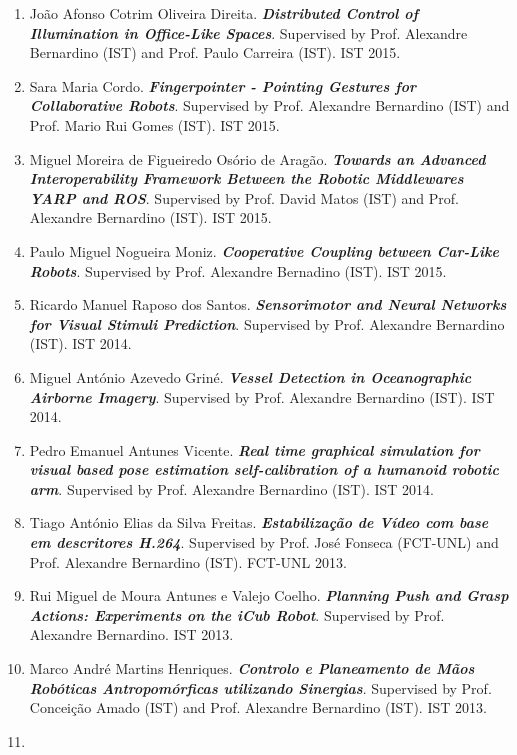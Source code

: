 \begin{enumerate}
{{  Detection with Multichannel Convolutional Neural Networks}}.
  Supervised by Prof. Jacinto Nascimento (IST) and Prof. Alexandre
  Bernardino (IST). IST 2015.
\item
  João Afonso Cotrim Oliveira Direita. \emph{\textbf{Distributed Control
  of Illumination in Office-Like Spaces}}. Supervised by Prof. Alexandre
  Bernardino (IST) and Prof. Paulo Carreira (IST). IST 2015.
\item
  Sara Maria Cordo. \emph{\textbf{Fingerpointer - Pointing Gestures for
  Collaborative Robots}}. Supervised by Prof. Alexandre Bernardino (IST)
  and Prof. Mario Rui Gomes (IST). IST 2015.
\item
  Miguel Moreira de Figueiredo Osório de Aragão. \emph{\textbf{Towards
  an Advanced Interoperability Framework Between the Robotic Middlewares
  YARP and ROS}}. Supervised by Prof. David Matos (IST) and Prof.
  Alexandre Bernardino (IST). IST 2015.
\item
  Paulo Miguel Nogueira Moniz. \emph{\textbf{Cooperative Coupling
  between Car-Like Robots}}. Supervised by Prof. Alexandre Bernadino
  (IST). IST 2015.
\item
  Ricardo Manuel Raposo dos Santos. \emph{\textbf{Sensorimotor and
  Neural Networks for Visual Stimuli Prediction}}. Supervised by Prof.
  Alexandre Bernardino (IST). IST 2014.
\item
  Miguel António Azevedo Griné. \emph{\textbf{Vessel Detection in
  Oceanographic Airborne Imagery}}. Supervised by Prof. Alexandre
  Bernardino (IST). IST 2014.
\item
  Pedro Emanuel Antunes Vicente. \emph{\textbf{Real time graphical
  simulation for visual based pose estimation self-calibration of a
  humanoid robotic arm}}. Supervised by Prof. Alexandre Bernardino
  (IST). IST 2014.
\item
  Tiago António Elias da Silva Freitas. \emph{\textbf{Estabilização de
  Vídeo com base em descritores H.264}}. Supervised by Prof. José
  Fonseca (FCT-UNL) and Prof. Alexandre Bernardino (IST). FCT-UNL 2013.
\item
  Rui Miguel de Moura Antunes e Valejo Coelho. \emph{\textbf{Planning
  Push and Grasp Actions: Experiments on the iCub Robot}}. Supervised by
  Prof. Alexandre Bernardino. IST 2013.
\item
  Marco André Martins Henriques. \emph{\textbf{Controlo e Planeamento de
  Mãos Robóticas Antropomórficas utilizando Sinergias}}. Supervised by
  Prof. Conceição Amado (IST) and Prof. Alexandre Bernardino (IST). IST
  2013.
\item

\end{enumerate}
